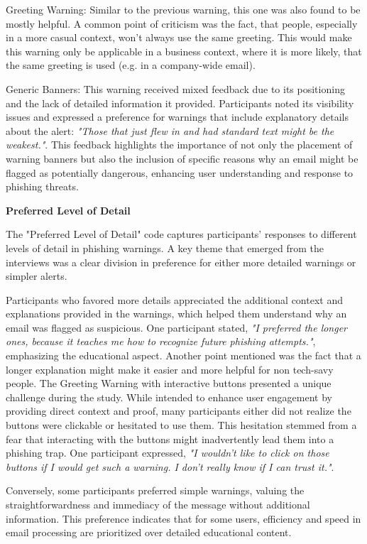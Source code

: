 \documentclass[
  a4paper,  %
  twoside,  %
  bibliography=totoc,
  headsepline,
  cleardoublepage=empty,
  parskip=half,
  draft=false
]{scrbook}
\begin{document}
Greeting Warning: Similar to the previous warning, this one was also found to be mostly helpful. A common point of criticism was the fact, that people, especially in a more casual context, won't always use the same greeting. This would make this warning only be applicable in a business context, where it is more likely, that the same greeting is used (e.g. in a company-wide email).
    
Generic Banners: This warning received mixed feedback due to its positioning and the lack of detailed information it provided. Participants noted its visibility issues and expressed a preference for warnings that include explanatory details about the alert: \textit{"Those that just flew in and had standard text might be the weakest."}. This feedback highlights the importance of not only the placement of warning banners but also the inclusion of specific reasons why an email might be flagged as potentially dangerous, enhancing user understanding and response to phishing threats.


\textbf{Preferred Level of Detail}

The "Preferred Level of Detail" code captures participants' responses to different levels of detail in phishing warnings. A key theme that emerged from the interviews was a clear division in preference for either more detailed warnings or simpler alerts. \par
Participants who favored more details appreciated the additional context and explanations provided in the warnings, which helped them understand why an email was flagged as suspicious. One participant stated, \textit{"I preferred the longer ones, because it teaches me how to recognize future phishing attempts."}, emphasizing the educational aspect. Another point mentioned was the fact that a longer explanation might make it easier and more helpful for non tech-savy people. The Greeting Warning with interactive buttons presented a unique challenge during the study. While intended to enhance user engagement by providing direct context and proof, many participants either did not realize the buttons were clickable or hesitated to use them. This hesitation stemmed from a fear that interacting with the buttons might inadvertently lead them into a phishing trap. One participant expressed, \textit{"I wouldn’t like to click on those buttons if I would get such a warning. I don’t really know if I can trust it."}. \par
Conversely, some participants preferred simple warnings, valuing the straightforwardness and immediacy of the message without additional information. This preference indicates that for some users, efficiency and speed in email processing are prioritized over detailed educational content. 
\end{document}
